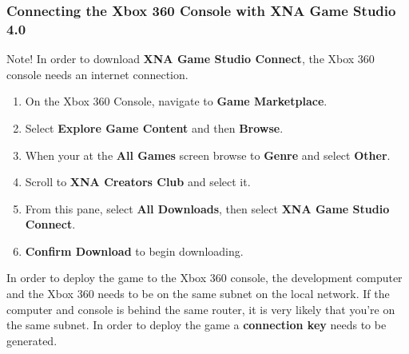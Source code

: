 \subsubsection{Connecting the Xbox 360 Console with XNA Game Studio 4.0}

Note! In order to download \textbf{XNA Game Studio Connect}, the Xbox 360 console needs an internet connection. \\

\begin{enumerate}
	\item On the Xbox 360 Console, navigate to \textbf{Game Marketplace}.
	\item Select \textbf{Explore Game Content} and then \textbf{Browse}. 
	\item When your at the \textbf{All Games} screen browse to \textbf{Genre} and select \textbf{Other}. 
	\item Scroll to \textbf{XNA Creators Club} and select it. 
	\item From this pane, select \textbf{All Downloads}, then select \textbf{XNA Game Studio Connect}. 
	\item \textbf{Confirm Download} to begin downloading. 
\end{enumerate}

In order to deploy the game to the Xbox 360 console, the development computer and the Xbox 360 needs to be on the same subnet on the local network. If the computer and console is behind the same router, it is very likely that you're on the same subnet. In order to deploy the game a \textbf{connection key} needs to be generated. \\

